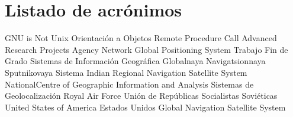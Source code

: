 \chapter{Listado de acrónimos}

{\small
\begin{acronym}[XXXXXXXX]
  		{\acs{GNU} is Not Unix}
  			{Orientación a Objetos}
  		{Remote Procedure Call}
  	{Advanced Research Projects Agency Network}
  		{Global Positioning System}
  		{Trabajo Fin de Grado}
  		{Sistemas de Información Geográfica}
  	{Globalnaya Navigatsionnaya Sputnikovaya Sistema}
  		{Indian Regional Navigation Satellite System}
  		{NationalCentre of Geographic Information and Analysis}
  			{Sistemas de Geolocalización}
  		{Royal Air Force}
  		{Unión de Repúblicas Socialistas Soviéticas}
  		{United States of America}
  		{Estados Unidos}
  		{Global Navigation Satellite System}
\end{acronym}
}




